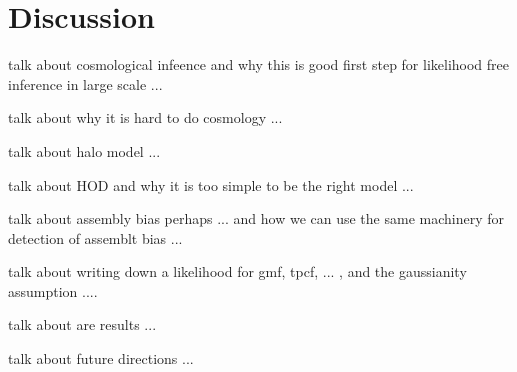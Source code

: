 \documentclass[12pt, preprint]{aastex}
\begin{document}
\section{Discussion}

talk about cosmological infeence and why this is good first step for likelihood free inference in large scale ...

talk about why it is hard to do cosmology ...

talk about halo model ...

talk about HOD and why it is too simple to be the right model ...

talk about assembly bias perhaps ... and how we can use the same machinery for detection of assemblt bias ... 

talk about writing down a likelihood for gmf, tpcf, ... , and the gaussianity assumption ....

talk about are results ...


talk about future directions ...

\begin{thebibliography}{70}


\end{thebibliography}
\end{document}
